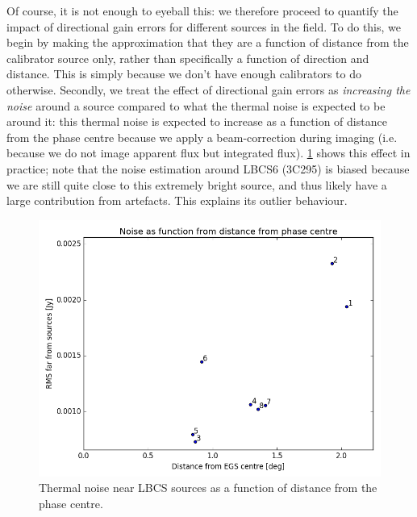 \pg
Of course, it is not enough to eyeball this: we therefore proceed to quantify the impact of directional gain errors for different sources in the field. To do this, we begin by making the approximation that they are a function of distance from the calibrator source only, rather than specifically a function of direction and distance. This is simply because we don't have enough calibrators to do otherwise. Secondly, we treat the effect of directional gain errors as \textit{increasing the noise} around a source compared to what the thermal noise is expected to be around it: this thermal noise is expected to increase as a function of distance from the phase centre because we apply a beam-correction during imaging (i.e. because we do not image apparent flux but integrated flux). \cref{fig.noiserms.distEGS} shows this effect in practice; note that the noise estimation around LBCS6 (3C295) is biased because we are still quite close to this extremely bright source, and thus likely have a large contribution from artefacts. This explains its outlier behaviour.
\begin{figure}[h!]
\includegraphics[width=0.8\linewidth]{images/RMSvsDistFromEGS.png}
\caption{Thermal noise near LBCS sources as a function of distance from the phase centre.}
\label{fig.noiserms.distEGS}
\end{figure}

